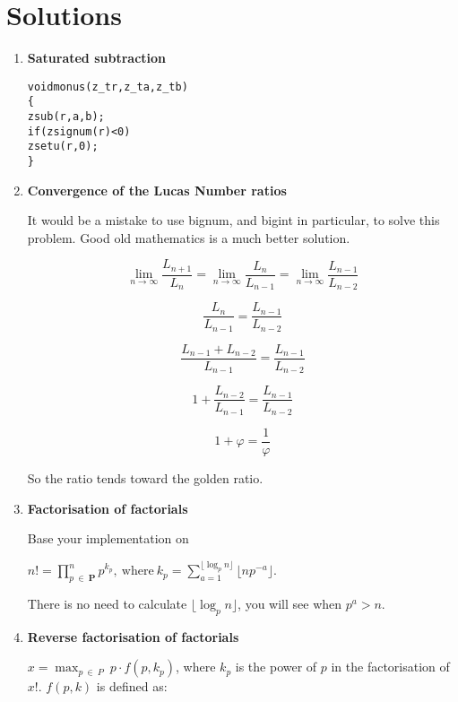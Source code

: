 \chapter{Solutions}
\label{chap:Solutions}


\begin{enumerate}[label=\textbf{\arabic*}.]

\item \textbf{Saturated subtraction}

\vspace{-1em}
\begin{alltt}
void monus(z_t r, z_t a, z_t b)
\{
    zsub(r, a, b);
    if (zsignum(r) < 0)
        zsetu(r, 0);
\}
\end{alltt}



\item \textbf{Convergence of the Lucas Number ratios}

It would be a mistake to use bignum, and bigint in particular,
to solve this problem. Good old mathematics is a much better solution.

$$ \lim_{n \to \infty} \frac{L_{n + 1}}{L_n} = \lim_{n \to \infty} \frac{L_{n}}{L_{n - 1}} = \lim_{n \to \infty} \frac{L_{n - 1}}{L_{n - 2}} $$

$$ \frac{L_{n}}{L_{n - 1}} = \frac{L_{n - 1}}{L_{n - 2}} $$

$$ \frac{L_{n - 1} + L_{n - 2}}{L_{n - 1}} = \frac{L_{n - 1}}{L_{n - 2}} $$

$$ 1 + \frac{L_{n - 2}}{L_{n - 1}} = \frac{L_{n - 1}}{L_{n - 2}} $$

$$ 1 + \varphi = \frac{1}{\varphi} $$

So the ratio tends toward the golden ratio.



\item \textbf{Factorisation of factorials}

Base your implementation on

\( \displaystyle{
    n! = \prod_{p~\in~\textbf{P}}^{n} p^{k_p}, ~\text{where}~
    k_p = \sum_{a = 1}^{\lfloor \log_p n \rfloor} \lfloor np^{-a} \rfloor.
}\)

There is no need to calculate $\lfloor \log_p n \rfloor$,
you will see when $p^a > n$.



\item \textbf{Reverse factorisation of factorials}

$\displaystyle{x = \max_{p ~\in~ P} ~ p \cdot f(p, k_p)}$,
where $k_p$ is the power of $p$ in the factorisation
of $x!$. $f(p, k)$ is defined as:


\end{enumerate}
